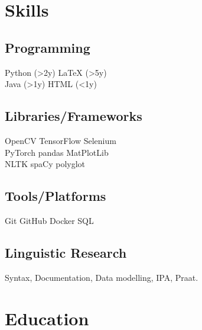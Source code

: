 \documentclass[]{plushcv}
\begin{document}
\begin{minipage}[t]{0.25\textwidth} 


\section{Skills}
\subsection{Programming}
\sectionsep
{} 
Python (>2y) \textbullet{} LaTeX (>5y)  \\
\sectionsep
{}
Java (>1y) \textbullet{}  HTML (<1y) \\
\sectionsep
\subsection{Libraries/Frameworks}
\sectionsep
OpenCV \textbullet{} TensorFlow \textbullet{} Selenium\\
PyTorch \textbullet{} pandas \textbullet{} MatPlotLib \\
NLTK \textbullet{} spaCy \textbullet{} polyglot
\sectionsep
\subsection{Tools/Platforms}
\sectionsep
Git \textbullet{} GitHub \textbullet{} Docker \textbullet{} SQL \\
\sectionsep
\subsection{Linguistic Research}
\sectionsep
Syntax, Documentation, Data modelling, IPA, Praat.
\sectionsep


\section{Education} 



\end{minipage}
\end{document}
